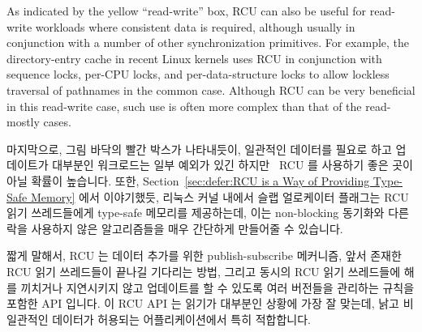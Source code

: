 As indicated by the yellow ``read-write'' box, RCU can also be useful
for read-write
workloads where consistent data is required, although usually in
conjunction with a number of other synchronization primitives.
For example, the directory-entry cache in recent Linux kernels uses RCU in
conjunction with sequence locks, per-CPU locks, and per-data-structure
locks to allow lockless traversal of pathnames in the common case.
Although RCU can be very beneficial in this read-write case, such
use is often more complex than that of the read-mostly cases.
\fi

마지막으로, 그림 바닥의 빨간 박스가 나타내듯이, 일관적인 데이터를 필요로 하고
업데이트가 대부분인 워크로드는 일부 예외가 있긴
하지만~\cite{MathieuDesnoyers2012URCU} RCU 를 사용하기 좋은 곳이 아닐 확률이
높습니다.
또한,
Section~\ref{sec:defer:RCU is a Way of Providing Type-Safe Memory} 에서
이야기했듯, 리눅스 커널 내에서  슬랩 얼로케이터
플래그는 RCU 읽기 쓰레드들에게 type-safe 메모리를 제공하는데, 이는 non-blocking
동기화와 다른 락을 사용하지 않은 알고리즘들을 매우 간단하게 만들어줄 수
있습니다.

짧게 말해서, RCU 는 데이터 추가를 위한 publish-subscribe 메커니즘, 앞서 존재한
RCU 읽기 쓰레드들이 끝나길 기다리는 방법, 그리고 동시의 RCU 읽기 쓰레드들에
해를 끼치거나 지연시키지 않고 업데이트를 할 수 있도록 여러 버전들을 관리하는
규칙을 포함한 API 입니다.
이 RCU API 는 읽기가 대부분인 상황에 가장 잘 맞는데, 낡고 비일관적인 데이터가
허용되는 어플리케이션에서 특히 적합합니다.

